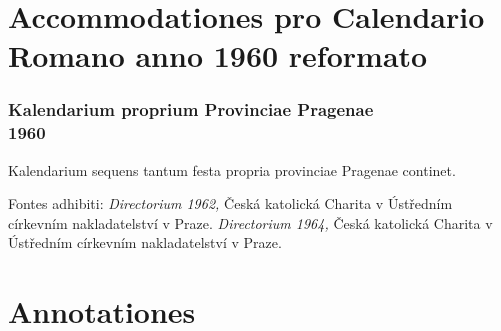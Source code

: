 \documentclass[12pt, a5paper, twoside]{book}
\begin{document}


\part{Accommodationes pro Calendario Romano anno 1960 reformato}

\section*{Kalendarium proprium Provinciae Pragenae\\1960}

{\footnotesize
  Kalendarium sequens tantum festa propria provinciae Pragenae
  continet.

  Fontes adhibiti:
  \emph{Directorium 1962,} Česká katolická Charita v Ústředním církevním nakladatelství v Praze.
  \emph{Directorium 1964,} Česká katolická Charita v Ústředním církevním nakladatelství v Praze.
}


\cleardoublepage




\part{Annotationes}




\printbibliography
\end{document}
